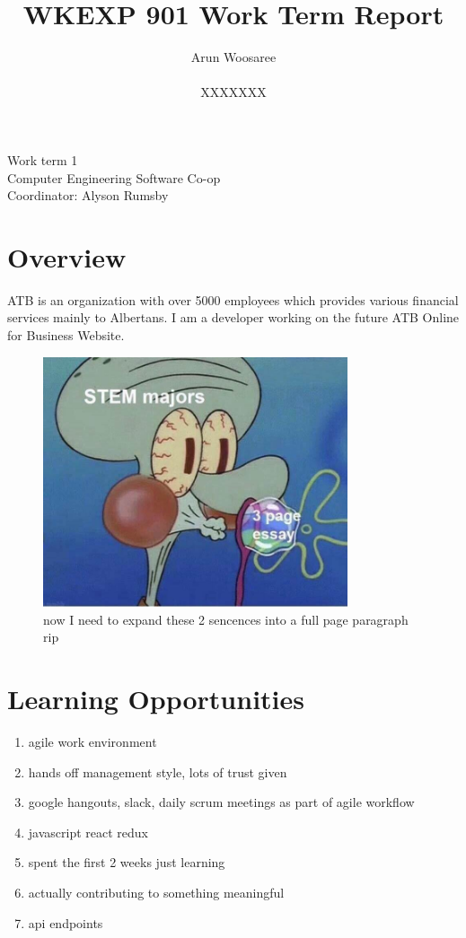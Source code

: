 \documentclass[letterpaper,12pt]{article}
\title{WKEXP 901 Work Term Report}
\author{Arun Woosaree \\ \\  XXXXXXX}
\begin{document}
\begin{titlepage}
\maketitle
\thispagestyle{empty}
\centering
\large
\vspace{1cm}
Work term 1\\
\vspace{1cm}
Computer Engineering Software Co-op \\
\vspace{1cm}
Coordinator: Alyson Rumsby
\end{titlepage}

\section{Overview}

ATB is an organization with over 5000 employees \cite{annualreport2017} which provides various financial services mainly to Albertans.
I am a developer working on the future ATB Online for Business Website.

\begin{figure}[h]
 \centering
 \includegraphics[width=0.8\textwidth]{stem.jpg}
 \caption{now I need to expand these 2 sencences into a full page paragraph rip}
\end{figure}

\section{Learning Opportunities}
\begin{enumerate}
  \item agile work environment
  \item hands off management style, lots of trust given
  \item google hangouts, slack, daily scrum meetings as part of agile workflow
  \item javascript react redux
  \item spent the first 2 weeks just learning
  \item actually contributing to something meaningful
  \item api endpoints
\end{enumerate}
\end{document}
